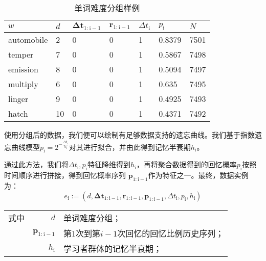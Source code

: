 \begin{table}[htbp]
    \caption{单词难度分组样例}
    \label{tab:difficulty}
    \vspace{0.5em}\centering\wuhao
    \begin{tabular}{lllllll}
    \toprule[1.5pt]
    $w$          & $d$  & $\bm{\Delta t}_\mathrm{1:i-1}$ & $\bm r_\mathrm{1:i-1}$& $\Delta t_\mathrm{i}$ & $p_\mathrm{i}$& $N$ \\ 
    \midrule[1pt]
    automobile & 2  & 0          & 0          & 1        & 0.8379    & 7501       \\
    temper     & 7  & 0          & 0          & 1        & 0.5867    & 7498       \\
    emission   & 8  & 0          & 0          & 1        & 0.5094    & 7497       \\
    multiply   & 6  & 0          & 0          & 1        & 0.635     & 7495       \\
    linger     & 9  & 0          & 0          & 1        & 0.4925    & 7493       \\
    hatch      & 10 & 0          & 0          & 1        & 0.4371    & 7492       \\ 
    \bottomrule[1.5pt]
    \end{tabular}
\end{table}

使用分组后的数据，我们便可以绘制有足够数据支持的遗忘曲线。我们基于指数遗忘曲线模型$p_\mathrm{i} = 2^{-\frac{\Delta t_\mathrm{i}}{h_\mathrm{i}}}$对其进行拟合，并由此得到记忆半衰期$h_\mathrm{i}$。

通过此方法，我们将$\Delta t_\mathrm{i} , p_\mathrm{i}$特征降维得到$h_\mathrm{i}$，再将聚合数据得到的回忆概率$p_\mathrm{i}$按照时间顺序进行拼接，得到回忆概率序列 $\bm p_\mathrm{1:i-1}$作为特征之一。最终，数据实例为：
\begin{equation}
\label{eqn:event:final}
e_\mathrm{i}:=(d, \bm{\Delta t}_\mathrm{1:i-1}, \bm r_\mathrm{1:i-1}, \bm p_\mathrm{1:i-1}, \Delta t_\mathrm{i} , p_\mathrm{i}, h_\mathrm{i})
\end{equation}
\begin{tabularx}{\textwidth}{@{}l@{\quad}r@{———}X@{}}
    式中& $d$ &单词难度分组；\\
    &  $\bm p_\mathrm{1:i-1}$ &第$1$次到第$i-1$次回忆的回忆比例历史序列；\\
    &  $h_\mathrm{i}$ &学习者群体的记忆半衰期；
\end{tabularx}\vspace{3.15bp}

